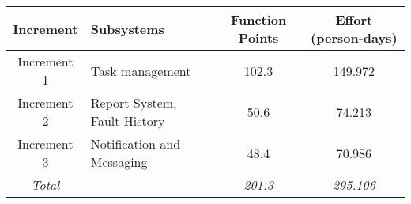 \begin{tabular}{c|l|c|c}
\textbf{Increment} & \textbf{Subsystems} & \textbf{Function Points} & \textbf{Effort (person-days)} \\ \hline
Increment 1 & Task management & 102.3 & 149.972 \\
Increment 2 & Report System, Fault History & 50.6 & 74.213 \\
Increment 3 & Notification and Messaging & 48.4 & 70.986 \\ \hline
\textit{Total} &  & \textit{201.3} & \textit{295.106} \\
\end{tabular}
